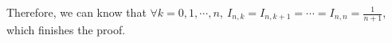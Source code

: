 \documentclass[a4paper]{article}
\begin{document}
Therefore, we can know that $\forall k=0,1,\cdots,n,~I_{n,k} = I_{n,k+1} = \cdots = I_{n,n} = \frac{1}{n+1}$, which finishes the proof. 


\end{document}

